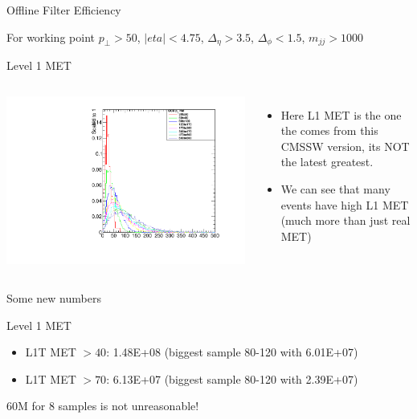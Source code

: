 \documentclass[8pt]{beamer}
\begin{document}
\begin{frame}{Offline Filter Efficiency}

For working point $p_\perp>50$, $|eta|<4.75$, $\Delta_{\eta}>3.5$, $\Delta_{\phi}<1.5$, $m_{jj}>1000$

\begin{block}{Level 1 MET}

\begin{columns}


  \centering
  \includegraphics[width=0.8\linewidth]{img/L1Extra_MET.pdf}


\begin{itemize}
  \item Here L1 MET is the one the comes from this CMSSW version, its NOT the latest greatest.
  \item We can see that many events have high L1 MET (much more than just real MET)
\end{itemize}

\end{columns}
  
\end{block}


\end{frame}

\begin{frame}{Some new numbers}

\begin{block}{Level 1 MET}

\begin{itemize}
  \item L1T MET $ > 40$: 1.48E+08 (biggest sample 80-120 with 6.01E+07)
  \item L1T MET $ > 70$: 6.13E+07 (biggest sample 80-120 with 2.39E+07)
\end{itemize}

\end{block}

\begin{center}
60M for 8 samples is not unreasonable!
\end{center}

\end{frame}
\end{document}
